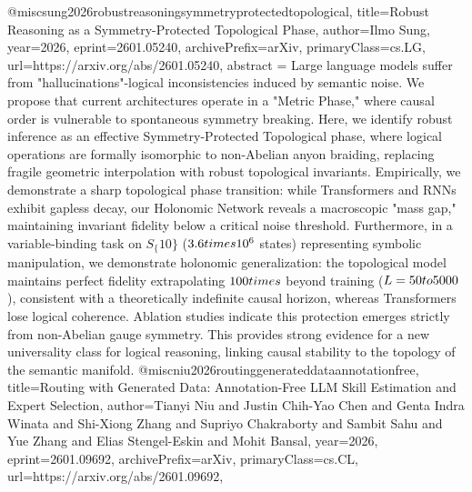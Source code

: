 {}@misc{sung2026robustreasoningsymmetryprotectedtopological,
      title={Robust Reasoning as a Symmetry-Protected Topological Phase}, 
      author={Ilmo Sung},
      year={2026},
      eprint={2601.05240},
      archivePrefix={arXiv},
      primaryClass={cs.LG},
      url={https://arxiv.org/abs/2601.05240},
      abstract = {Large language models suffer from "hallucinations"-logical inconsistencies induced by semantic noise. We propose that current architectures operate in a "Metric Phase," where causal order is vulnerable to spontaneous symmetry breaking. Here, we identify robust inference as an effective Symmetry-Protected Topological phase, where logical operations are formally isomorphic to non-Abelian anyon braiding, replacing fragile geometric interpolation with robust topological invariants. Empirically, we demonstrate a sharp topological phase transition: while Transformers and RNNs exhibit gapless decay, our Holonomic Network reveals a macroscopic "mass gap," maintaining invariant fidelity below a critical noise threshold. Furthermore, in a variable-binding task on $S_\{10\}$ ($3.6 \\times 10^6$ states) representing symbolic manipulation, we demonstrate holonomic generalization: the topological model maintains perfect fidelity extrapolating $100\\times$ beyond training ($L=50 \\to 5000$), consistent with a theoretically indefinite causal horizon, whereas Transformers lose logical coherence. Ablation studies indicate this protection emerges strictly from non-Abelian gauge symmetry. This provides strong evidence for a new universality class for logical reasoning, linking causal stability to the topology of the semantic manifold.}
}@misc{niu2026routinggenerateddataannotationfree,
      title={Routing with Generated Data: Annotation-Free LLM Skill Estimation and Expert Selection}, 
      author={Tianyi Niu and Justin Chih-Yao Chen and Genta Indra Winata and Shi-Xiong Zhang and Supriyo Chakraborty and Sambit Sahu and Yue Zhang and Elias Stengel-Eskin and Mohit Bansal},
      year={2026},
      eprint={2601.09692},
      archivePrefix={arXiv},
      primaryClass={cs.CL},
      url={https://arxiv.org/abs/2601.09692},
}
